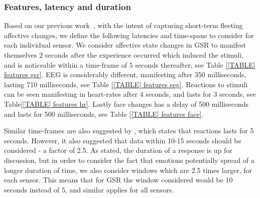 \subsubsection{Features, latency and duration}
Based on our previous work~\cite{9th_semester_project, first_paper}, with the intent of capturing short-term fleeting
affective changes, we define the following latencies and time-spans to consider for each individual sensor.  We consider
affective state changes in GSR to manifest themselves 2 seconds after the experience occurred which induced the stimuli,
and is noticeable within a time-frame of 5 seconds thereafter, see Table \ref{[TABLE] features gsr}. EEG is considerably
different, manifesting after 350 milliseconds, lasting 710 milliseconds, see Table \ref{[TABLE] features eeg}. Reactions
to stimuli can be seen manifesting in heart-rates after 4 seconds, and lasts for 3 seconds, see Table\ref{[TABLE]
  features hr}.  Lastly face changes has a delay of 500 milliseconds and lasts for 500 milliseconds, see Table
\ref{[TABLE] features face}.

Similar time-frames are also suggested by \cite{eeg_electrodes_0}, which states that reactions lasts for 5
seconds. However, it also suggested that data within 10-15 seconds should be considered - a factor of 2.5.  As stated,
the duration of a response is up for discussion, but in order to consider the fact that emotions potentially spread of a
longer duration of time, we also consider windows which are 2.5 times larger, for each sensor.  This means that for GSR
the window considered would be 10 seconds instead of 5, and similar applies for all sensors.

